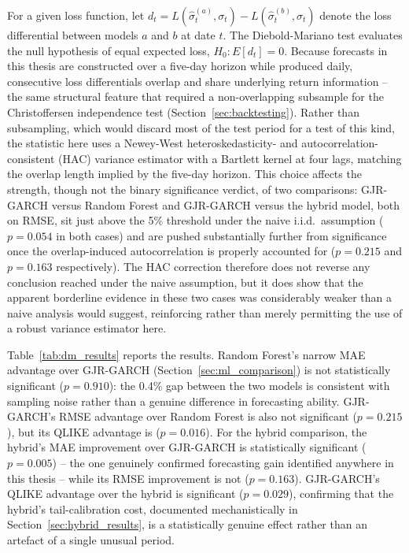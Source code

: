 \documentclass[12pt,a4paper]{article}
\begin{document}
For a given loss function, let $d_t = L(\hat\sigma_t^{(a)}, \sigma_t) - L(\hat\sigma_t^{(b)}, \sigma_t)$
denote the loss differential between models $a$ and $b$ at date $t$. The Diebold-Mariano test
evaluates the null hypothesis of equal expected loss, $H_0: E[d_t] = 0$. Because forecasts in this
thesis are constructed over a five-day horizon while produced daily, consecutive loss differentials
overlap and share underlying return information -- the same structural feature that required a
non-overlapping subsample for the Christoffersen independence test (Section~\ref{sec:backtesting}).
Rather than subsampling, which would discard most of the test period for a test of this kind, the
statistic here uses a Newey-West heteroskedasticity- and autocorrelation-consistent (HAC) variance
estimator with a Bartlett kernel at four lags, matching the overlap length implied by the five-day
horizon. This choice affects the strength, though not the binary significance verdict, of two
comparisons: GJR-GARCH versus Random Forest and GJR-GARCH versus the hybrid model, both on RMSE,
sit just above the 5\% threshold under the naive i.i.d.\ assumption ($p=0.054$ in both cases) and
are pushed substantially further from significance once the overlap-induced autocorrelation is
properly accounted for ($p=0.215$ and $p=0.163$ respectively). The HAC correction therefore does not
reverse any conclusion reached under the naive assumption, but it does show that the apparent
borderline evidence in these two cases was considerably weaker than a naive analysis would suggest,
reinforcing rather than merely permitting the use of a robust variance estimator here.

Table~\ref{tab:dm_results} reports the results. Random Forest's narrow MAE advantage over GJR-GARCH
(Section~\ref{sec:ml_comparison}) is not statistically significant ($p=0.910$): the 0.4\% gap
between the two models is consistent with sampling noise rather than a genuine difference in
forecasting ability. GJR-GARCH's RMSE advantage over Random Forest is also not significant
($p=0.215$), but its QLIKE advantage is ($p=0.016$). For the hybrid comparison, the hybrid's MAE
improvement over GJR-GARCH is statistically significant ($p=0.005$) -- the one genuinely confirmed
forecasting gain identified anywhere in this thesis -- while its RMSE improvement is not
($p=0.163$). GJR-GARCH's QLIKE advantage over the hybrid is significant ($p=0.029$), confirming
that the hybrid's tail-calibration cost, documented mechanistically in Section~\ref{sec:hybrid_results},
is a statistically genuine effect rather than an artefact of a single unusual period.
\end{document}
